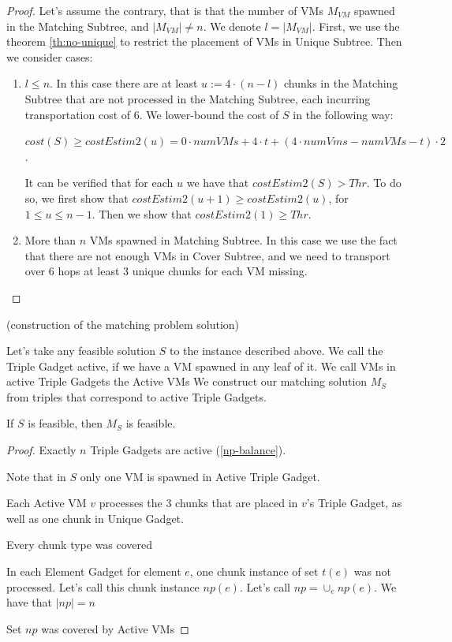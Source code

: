 \documentclass[conference,10pt]{IEEEtran}
\begin{document}
\begin{proof}
  Let's assume the contrary, that is that the number of VMs $M_{VM}$
  spawned in the Matching Subtree, and $|M_{VM}| \neq n$. We denote
  $l=|M_{VM}|$. First, we use the theorem \ref{th:no-unique} to
  restrict the placement of VMs in Unique Subtree. Then we consider
  cases:
  \begin{enumerate}
  \item $l \leq n$. In this case there are at least
    $u := 4 \cdot (n-l)$ chunks in the Matching Subtree that are not
    processed in the Matching Subtree, each incurring transportation
    cost of $6$. We lower-bound the cost of $S$ in the following way:

    $cost(S) \geq costEstim2(u) = 0\cdot numVMs + 4\cdot t + (4\cdot
    numVms - numVMs - t)\cdot 2$.

    It can be verified that for each $u$ we have that
    $costEstim2(S) > Thr$. To do so, we first show that
    $costEstim2(u+1) \geq costEstim2(u)$, for $1\leq u \leq n-1$. Then
    we show that $costEstim2(1) \geq Thr$.

  \item More than $n$ VMs spawned in Matching Subtree. In this case we
    use the fact that there are not enough VMs in Cover Subtree, and
    we need to transport over $6$ hops at least 3 unique chunks for
    each VM missing.

  \end{enumerate}
\end{proof}

(construction of the matching problem solution)

Let's take any feasible solution $S$ to the instance described
above. We call the Triple Gadget active, if we have a VM spawned in
any leaf of it. We call VMs in active Triple Gadgets the Active VMs We
construct our matching solution $M_S$ from triples that correspond to
active Triple Gadgets.

\begin{lemma}
  If $S$ is feasible, then $M_S$ is feasible.
\end{lemma}

\begin{proof}
\item Exactly $n$ Triple Gadgets are active (\ref{np-balance}).
\item Note that in $S$ only one VM is spawned in Active Triple Gadget.
\item Each Active VM $v$ processes the 3 chunks that are placed in
  $v$'s Triple Gadget, as well as one chunk in Unique Gadget.
\item Every chunk type was covered
\item In each Element Gadget for element $e$, one chunk instance of
  set $t(e)$ was not processed. Let's call this chunk instance
  $np(e)$. Let's call $np = \cup_e np(e)$. We have that $|np| = n$
\item Set $np$ was covered by Active VMs
\item
\end{proof}
\end{document}
